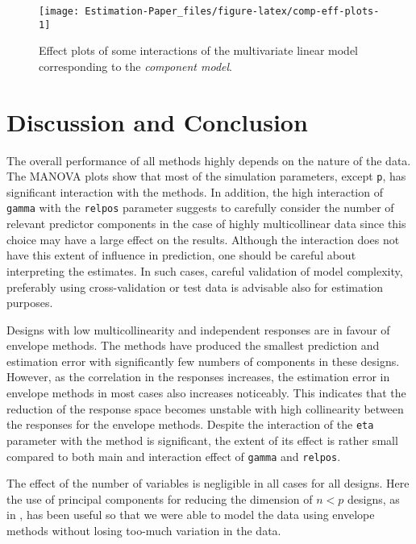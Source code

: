 \documentclass[12pt,3p,authoryear]{elsarticle}
\begin{document}
\begin{figure}[!htb]
\texttt{[image: Estimation-Paper\_files/figure-latex/comp-eff-plots-1]} \caption{Effect plots of some interactions of the multivariate linear model corresponding to the \emph{component model}.}\label{fig:comp-eff-plots}
\end{figure}

\hypertarget{discussion-and-conclusion}{%
\section{Discussion and Conclusion}\label{discussion-and-conclusion}}

The overall performance of all methods highly depends on the nature of the data. The MANOVA plots show that most of the simulation parameters, except \texttt{p}, has significant interaction with the methods. In addition, the high interaction of \texttt{gamma} with the \texttt{relpos} parameter suggests to carefully consider the number of relevant predictor components in the case of highly multicollinear data since this choice may have a large effect on the results. Although the interaction does not have this extent of influence in prediction, one should be careful about interpreting the estimates. In such cases, careful validation of model complexity, preferably using cross-validation or test data is advisable also for estimation purposes.

Designs with low multicollinearity and independent responses are in favour of envelope methods. The methods have produced the smallest prediction and estimation error with significantly few numbers of components in these designs. However, as the correlation in the responses increases, the estimation error in envelope methods in most cases also increases noticeably. This indicates that the reduction of the response space becomes unstable with high collinearity between the responses for the envelope methods. Despite the interaction of the \texttt{eta} parameter with the method is significant, the extent of its effect is rather small compared to both main and interaction effect of \texttt{gamma} and \texttt{relpos}.

The effect of the number of variables is negligible in all cases for all designs. Here the use of principal components for reducing the dimension of \(n<p\) designs, as in \citet{rimal2019pred}, has been useful so that we were able to model the data using envelope methods without losing too-much variation in the data.
\end{document}
